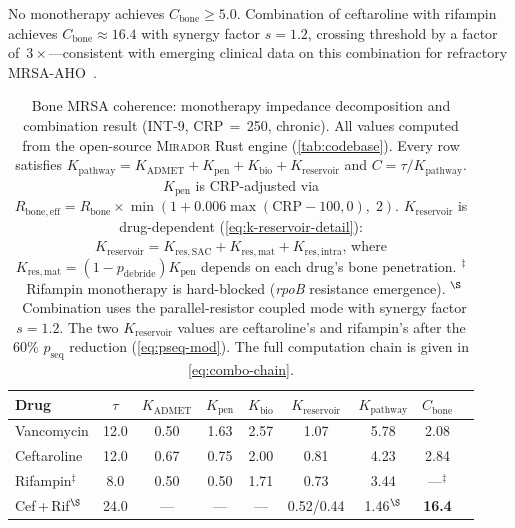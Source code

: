 \documentclass[11pt]{article}
\theoremstyle{plain}
\theoremstyle{definition}
\newcommand{\mirador}{\textsc{Mirador}}
\newcommand{\Kpath}{K_{\mathrm{pathway}}}
\newcommand{\Kres}{K_{\mathrm{reservoir}}}
\newcommand{\Kadmet}{K_{\mathrm{ADMET}}}
\begin{document}
No monotherapy achieves
$C_{\mathrm{bone}} \geq 5.0$. Combination of ceftaroline with
rifampin achieves $C_{\mathrm{bone}} \approx 16.4$ with
synergy factor $s = 1.2$, crossing
threshold by a factor of~$3\times$---consistent
with emerging clinical data on this combination for refractory
MRSA-AHO~\cite{Barber2015, Schauf2021}.

\begin{table}[t]
\centering
\small
\begin{tabular}{lcccccccc}
\toprule
\textbf{Drug} & $\tau$ & $\Kadmet$ & $K_{\mathrm{pen}}$ &
  $K_{\mathrm{bio}}$ & $\Kres$ & $\Kpath$ & $C_{\mathrm{bone}}$ \\
\midrule
Vancomycin  & 12.0 & 0.50 & 1.63 & 2.57 & 1.07 & 5.78 & 2.08 \\
Ceftaroline & 12.0 & 0.67 & 0.75 & 2.00 & 0.81 & 4.23 & 2.84 \\
Rifampin$^\ddagger$
            & 8.0  & 0.50 & 0.50 & 1.71 & 0.73 & 3.44 & ---$^\ddagger$ \\
\midrule
Cef\,+\,Rif$^\S$
            & 24.0 & ---  & ---  & ---  & 0.52/0.44 & 1.46$^\S$ & \textbf{16.4} \\
\bottomrule
\end{tabular}
\caption{Bone MRSA coherence: monotherapy impedance decomposition
and combination result (INT-9, CRP\,$=$\,250, chronic).
All values computed from the open-source \mirador{} Rust engine
(\cref{tab:codebase}).
Every row satisfies $\Kpath = \Kadmet + K_{\mathrm{pen}} +
K_{\mathrm{bio}} + \Kres$ and $C = \tau / \Kpath$.
$K_{\mathrm{pen}}$ is CRP-adjusted via
$R_{\mathrm{bone,eff}} = R_{\mathrm{bone}} \times
\min(1 + 0.006 \max(\mathrm{CRP}-100, 0),\; 2)$.
$\Kres$ is drug-dependent (\cref{eq:k-reservoir-detail}):
$\Kres = K_{\mathrm{res,SAC}} + K_{\mathrm{res,mat}} +
K_{\mathrm{res,intra}}$, where $K_{\mathrm{res,mat}} =
(1 - p_{\mathrm{debride}}) K_{\mathrm{pen}}$ depends on each
drug's bone penetration.
$^\ddagger$~Rifampin monotherapy is hard-blocked
(\emph{rpoB} resistance emergence).
$^\S$~Combination uses the parallel-resistor coupled mode
with synergy factor $s = 1.2$. The two $\Kres$ values are
ceftaroline's and rifampin's after the 60\% $p_{\mathrm{seq}}$
reduction (\cref{eq:pseq-mod}).
The full computation chain is given in
\cref{eq:combo-chain}.}
\label{tab:bone-results}
\end{table}
\end{document}

